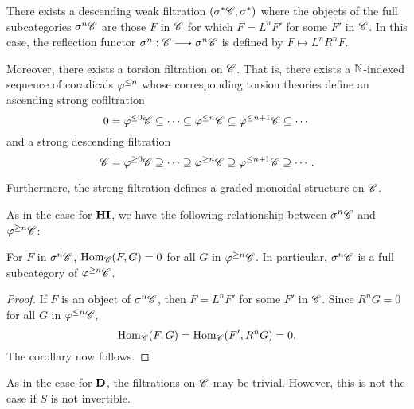 \begin{thm}\label{thm_sum_heart}
There exists a descending weak filtration $(\sigma^{*}\mathscr{C}, 
\sigma^{*})$ where the objects of the full subcategories 
$\sigma^{n}\mathscr{C}$ are those $F$ in $\mathscr{C}$ for which $F = L^nF'$ 
for some $F'$ in $\mathscr{C}$. In this case, the reflection functor 
$\sigma^{n}: \mathscr{C} \longrightarrow \sigma^{n}\mathscr{C}$ is defined by $F \mapsto 
L^nR^n F$.

Moreover, there exists a torsion filtration on $\mathscr{C}$. That is, 
there exists a $\mathbb{N}$-indexed sequence of coradicals $\varphi^{\leq n}$ 
whose corresponding torsion theories define an ascending strong 
cofiltration
\[
0 = \varphi^{\leq 0}\mathscr{C} \subseteq \cdots \subseteq \varphi^{\leq n}\mathscr{C}
   \subseteq \varphi^{\leq n + 1}\mathscr{C} \subseteq \cdots
\]
and a strong descending filtration
\[
\mathscr{C} = \varphi^{\geq 0}\mathscr{C} \supseteq \cdots \supseteq \varphi^{\geq n}\mathscr{C}
\supseteq \varphi^{\leq n + 1}\mathscr{C} \supseteq \cdots.
\]

Furthermore, the strong filtration defines a graded monoidal 
structure on $\mathscr{C}$.
\end{thm}
\noproof

As in the case for $\mathbf{HI}$, we have the following relationship 
between $\sigma^{n}\mathscr{C}$ and $\varphi^{\geq n}\mathscr{C}$:

\begin{cor}\label{cor_sg_sub_prerad}
For $F$ in $\sigma^{n}\mathscr{C}$, $\mathrm{Hom}_{\mathscr{C}}(F, G) = 0$ for
all $G$ in $\varphi^{\geq n}\mathscr{C}$. In particular, $\sigma^{n}\mathscr{C}$
is a full subcategory of $\varphi^{\geq n}\mathscr{C}$.
\end{cor}
\begin{proof}
If $F$ is an object of $\sigma^{n}\mathscr{C}$, then $F = L^n F'$ for
some $F'$ in $\mathscr{C}$. Since $R^n G = 0$ for all $G$ in 
$\varphi^{\leq n}\mathscr{C}$,
\[
\mathrm{Hom}_{\mathscr{C}}(F, G) = \mathrm{Hom}_{\mathscr{C}}(F', R^n G) = 0.
\]
The corollary now follows.
\end{proof}

As in the case for $\mathbf{D}$, the filtrations on $\mathscr{C}$ may be
trivial. However, this is not the case if $S$ is not invertible.

